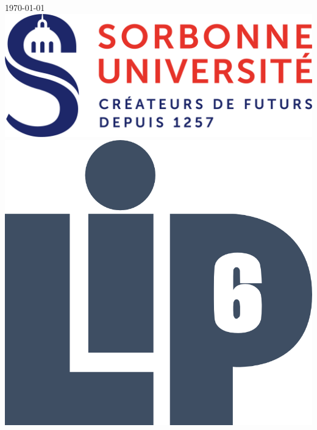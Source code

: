 \begin{titlepage}


{\large \today}\\[2cm] %


\includegraphics[scale=0.35]{include/logo_sorbonne.png}  %
\hspace{1.5cm}
\includegraphics[scale=0.35]{include/logo_lip6.png}\\ %


\vfill %

\end{titlepage}

